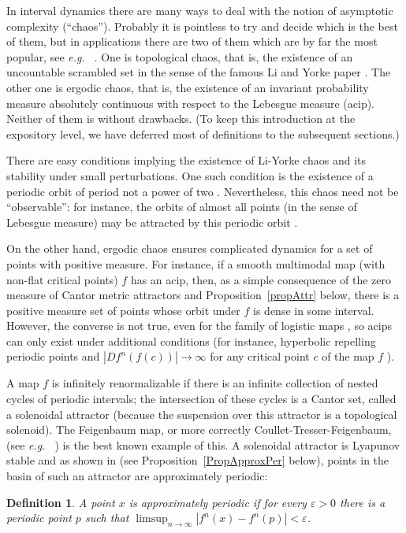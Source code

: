 \documentclass[12pt, psamsfonts, reqno]{amsart}
\newtheorem{definition}[theorem]{Definition}
\begin{document}
In interval dynamics there are many ways to deal with the notion
of asymptotic complexity (``chaos''). Probably it is pointless to
try and decide which is the best of them, but in applications
there are two of them which are by far the most popular, see {{\em e.g.~}}
\cite{Day, MMN}. One is topological chaos, that is, the existence
of an uncountable scrambled set in the sense of the famous Li and
Yorke paper \cite{LY}. The other one is ergodic chaos, that is,
the existence of an invariant probability measure absolutely
continuous with respect to the Lebesgue measure (acip). Neither of
them is without drawbacks. (To keep this introduction at
the expository level, we have deferred most of definitions to the
subsequent sections.)

There are easy conditions implying  the existence of Li-Yorke
chaos and its stability under small perturbations. One such
condition is the existence of a periodic orbit of period not a
power of two \cite{Blo}. Nevertheless, this chaos need not be
``observable'': for instance, the orbits  of almost all points
(in the sense of Lebesgue measure) may be attracted by
this periodic orbit \cite{Guc}.

On the other hand, ergodic chaos ensures complicated dynamics for
a set of points with positive measure. For instance, if a smooth
multimodal map (with non-flat critical points) $f$ has an acip,
then, as a simple consequence of the zero measure of Cantor metric
attractors \cite{vSV} and Proposition~\ref{propAttr} below, there
is a positive measure set of points whose orbit under $f$ is dense
in some interval. However, the converse is not true, even for the
family of logistic maps \cite{Joh,Lyu}, so acips can only exist
under additional conditions (for instance, hyperbolic repelling
periodic points and $|Df^n(f(c))|\to \infty$ for any critical
point $c$ of the map $f$ \cite{BRSS}).

A map $f$ is infinitely renormalizable if there is an infinite
collection of nested cycles of periodic intervals; the
intersection of these cycles is a Cantor set, called a solenoidal
attractor (because the suspension over this attractor is a
topological solenoid). The Feigenbaum map, or more correctly
Coullet-Tresser-Feigenbaum, (see {{\em e.g.~}} \cite[pp.
151-152]{dMvS}) is the best known example of this. A solenoidal
attractor is Lyapunov stable and as shown in \cite{BrJi} (see
Proposition~\ref{PropApproxPer} below), points in the basin of
such an attractor are approximately periodic:

\begin{definition}\label{DefApproxPer}
A point $x$ is \emph{approximately periodic} if for
every ${\varepsilon}>0$ there is a periodic point $p$ such that $\limsup_{n
\to\infty} |f^n(x)-f^n(p)| < {\varepsilon}$.
\end{definition}
\end{document}
